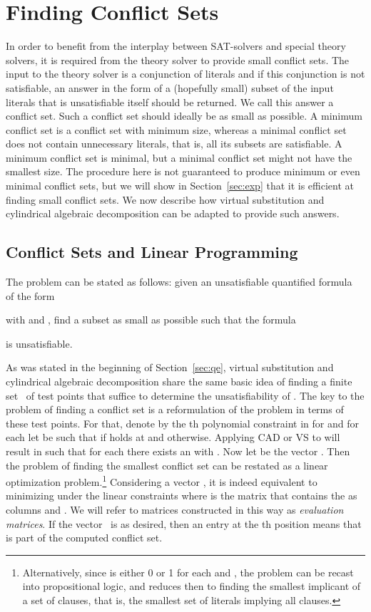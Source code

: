 \documentclass{llncs}
\begin{document}
\section{Finding Conflict Sets}
\label{sec:ic}

In order to benefit from the interplay between SAT-solvers and special theory
solvers, it is required from the theory solver to provide small conflict sets.
The input to the theory solver is a conjunction of literals and if this
conjunction is not satisfiable, an answer in the form of a (hopefully small)
subset of the input literals that is unsatisfiable itself should be returned.
We call this answer a conflict set.  Such a conflict set should ideally be as
small as possible.  A minimum conflict set is a conflict set with minimum size,
whereas a minimal conflict set does not contain unnecessary literals, that is,
all its subsets are satisfiable.  A minimum conflict set is minimal, but a
minimal conflict set might not have the smallest size.  The procedure here is
not guaranteed to produce minimum or even minimal conflict sets, but we will
show in Section~\ref{sec:exp} that it is efficient at finding small conflict
sets.  We now describe how virtual substitution and cylindrical algebraic
decomposition can be adapted to provide such answers.

\subsection{Conflict Sets  and Linear Programming}
\label{sec:ic:lp}

The problem can be stated as follows: given an unsatisfiable quantified
formula~ of the form

with  and , find a subset  as small as possible such that
the formula

is unsatisfiable.\goodbreak

As was stated in the beginning of Section~\ref{sec:qe}, virtual substitution and
cylindrical algebraic decomposition share the same basic idea of finding a
finite set~ of test points that suffice to determine the unsatisfiability of
. The key to the problem of finding a conflict set is a reformulation of
the problem in terms of these test points.  For that, denote by  the th
polynomial constraint in  for  and for each  let
 be such that  if  holds at  and 
otherwise.  Applying CAD or VS to  will result in 
such that for each  there exists an  with .  Now let 
be the vector .  Then the problem of finding
the smallest conflict set can be restated as a linear optimization
problem.\footnote{Alternatively, since  is either 0 or 1 for each 
  and , the problem can be recast into propositional logic, and reduces then
  to finding the smallest implicant of a set of clauses, that is, the smallest
  set of literals implying all clauses.}  Considering a vector ,
it is indeed equivalent to minimizing  under the linear
constraints 
where  is the matrix that contains the  as columns and
. We will refer to matrices  constructed in this way
as \textit{evaluation matrices}. If the vector~ is as desired, then an entry
 at the th position means that  is part of the computed conflict set.
\end{document}

